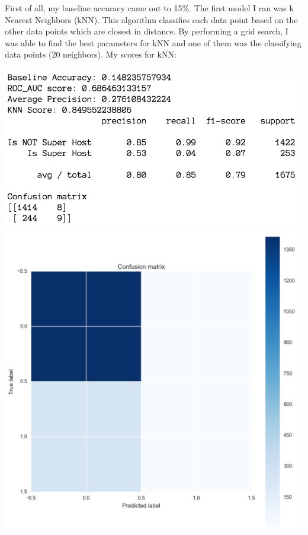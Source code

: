 \documentclass[10pt,letterpapter]{article}
\begin{document}
\begin{paragraph}
\indent \indent
First of all, my baseline accuracy came out to 15\%. The first model I ran was k Nearest Neighbors (kNN). This algorithm classifies each data point based on the other data points which are closest in distance. By performing a grid search, I was able to find the best parameters for kNN and one of them was the classifying data points (20 neighbors). My scores for kNN:
\\ \\
\includegraphics[scale=0.65]{knnscores.png} \\
\includegraphics[scale=0.30]{knncm.png} 

\end{paragraph}
\end{document}
